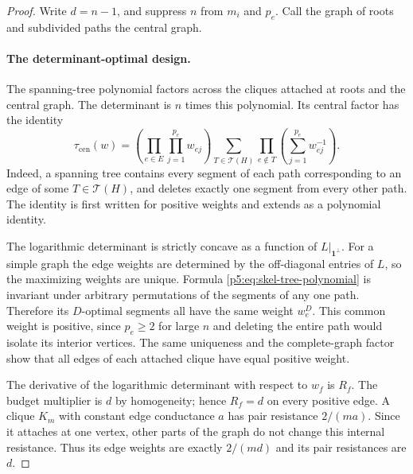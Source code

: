 \documentclass[11pt,a4paper]{article}
\theoremstyle{definition}
\theoremstyle{remark}
\numberwithin{equation}{section}
\begin{document}
\begin{proof}
Write $d=n-1$, and suppress $n$ from $m_i$ and $p_e$.
Call the graph of roots and subdivided paths the central graph.

\paragraph{The determinant-optimal design.}
The spanning-tree polynomial factors across the cliques attached
at roots and the central graph.  The determinant is $n$ times
this polynomial.  Its central factor has the identity
\begin{equation}\label{p5:eq:skel-tree-polynomial}
 \tau_{\mathrm{cen}}(w)
 =\left(\prod_{e\in E}\prod_{j=1}^{p_e}w_{ej}\right)
   \sum_{T\in\mathcal T(H)}
       \prod_{e\notin T}\left(\sum_{j=1}^{p_e}w_{ej}^{-1}\right).
\end{equation}
Indeed, a spanning tree contains every segment of each path
corresponding to an edge of some $T\in\mathcal T(H)$, and deletes
exactly one segment from every other path.  The identity is first
written for positive weights and extends as a polynomial identity.

The logarithmic determinant is strictly concave as a function of
$L|_{\mathbf1^\perp}$.  For a simple graph the edge weights are
determined by the off-diagonal entries of $L$, so the maximizing
weights are unique.  Formula \eqref{p5:eq:skel-tree-polynomial}
is invariant under arbitrary permutations of the segments of
any one path.  Therefore its $D$-optimal segments all have the
same weight $w_e^D$.  This common weight is positive, since
$p_e\geq2$ for large $n$ and deleting the entire path would
isolate its interior vertices.  The same uniqueness and the
complete-graph factor show that all edges of each attached
clique have equal positive weight.

The derivative of the logarithmic determinant with respect to
$w_f$ is $R_f$.  The budget multiplier is $d$ by homogeneity;
hence $R_f=d$ on every positive edge.  A clique $K_m$ with
constant edge conductance $a$ has pair resistance $2/(ma)$.
Since it attaches at one vertex, other parts of the graph do
not change this internal resistance.  Thus its edge weights
are exactly $2/(md)$ and its pair resistances are $d$.


\end{proof}
\end{document}
